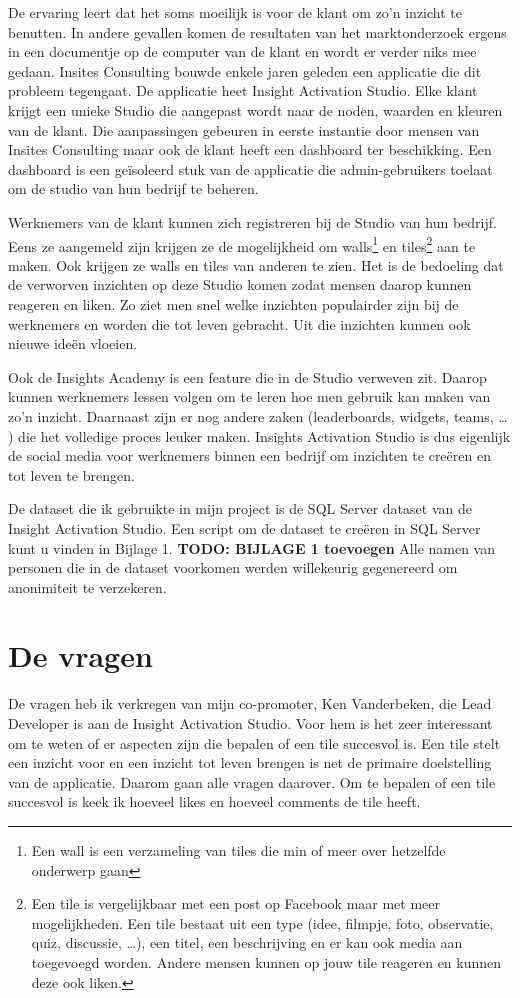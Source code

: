 De ervaring leert dat het soms moeilijk is voor de klant om zo'n inzicht te benutten. In andere gevallen komen de resultaten van het marktonderzoek ergens in een documentje op de computer van de klant en wordt er verder niks mee gedaan. Insites Consulting bouwde enkele jaren geleden een applicatie die dit probleem tegengaat. De applicatie heet Insight Activation Studio. Elke klant krijgt een unieke Studio die aangepast wordt naar de noden, waarden en kleuren van de klant. Die aanpassingen gebeuren in eerste instantie door mensen van Insites Consulting maar ook de klant heeft een dashboard ter beschikking. Een dashboard is een geïsoleerd stuk van de applicatie die admin-gebruikers toelaat om de studio van hun bedrijf te beheren.  

Werknemers van de klant kunnen zich registreren bij de Studio van hun bedrijf. Eens ze aangemeld zijn krijgen ze de mogelijkheid om walls\footnote{Een wall is een verzameling van tiles die min of meer over hetzelfde onderwerp gaan} en tiles\footnote{Een tile is vergelijkbaar met een post op Facebook maar met meer mogelijkheden. Een tile bestaat uit een type (idee, filmpje, foto, observatie, quiz, discussie, …), een titel, een beschrijving en er kan ook media aan toegevoegd worden. Andere mensen kunnen op jouw tile reageren en kunnen deze ook liken.} aan te maken. Ook krijgen ze walls en tiles van anderen te zien. Het is de bedoeling dat de verworven inzichten op deze Studio komen zodat mensen daarop kunnen reageren en liken. Zo ziet men snel welke inzichten populairder zijn bij de werknemers en worden die tot leven gebracht. Uit die inzichten kunnen ook nieuwe ideën vloeien.

Ook de Insights Academy is een feature die in de Studio verweven zit. Daarop kunnen werknemers lessen volgen om te leren hoe men gebruik kan maken van zo’n inzicht. Daarnaast zijn er nog andere zaken (leaderboards, widgets, teams, … ) die het volledige proces leuker maken. Insights Activation Studio is dus eigenlijk de social media voor werknemers binnen een bedrijf om inzichten te creëren en tot leven te brengen.

De dataset die ik gebruikte in mijn project is de SQL Server dataset van de Insight Activation Studio. Een script om de dataset te creëren in SQL Server kunt u vinden in Bijlage 1. \textbf{TODO: BIJLAGE 1 toevoegen} Alle namen van personen die in de dataset voorkomen werden willekeurig gegenereerd om anonimiteit te verzekeren.

\section{De vragen}
De vragen heb ik verkregen van mijn co-promoter, Ken Vanderbeken, die Lead Developer is aan de Insight Activation Studio. Voor hem is het zeer interessant om te weten of er aspecten zijn die bepalen of een tile succesvol is. Een tile stelt een inzicht voor en een inzicht tot leven brengen is net de primaire doelstelling van de applicatie. Daarom gaan alle vragen daarover. Om te bepalen of een tile succesvol is keek ik hoeveel likes en hoeveel comments de tile heeft.

